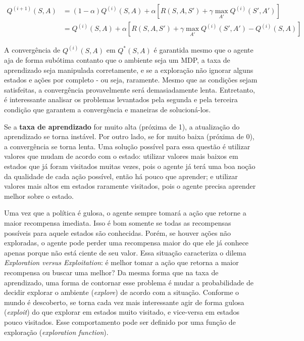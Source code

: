 \begin{equation} \label{eq:q_update}
\begin{align*}
Q^{(i+1)}(S,A) &= (1-\alpha)Q^{(i)}(S,A) + \alpha[R(S,A,S') + \gamma \max_{A'}Q^{(i)}(S',A')] \\
            &= Q^{(i)}(S,A) + \alpha[R(S,A,S') + \gamma \max_{A'}Q^{(i)}(S',A') - Q^{(i)}(S,A)]
\end{align*}
\end{equation}

A convergência de $Q^{(i)}(S,A)$ em $Q^{*}(S,A)$ é garantida mesmo que o agente aja de forma subótima contanto que o ambiente seja um MDP, a taxa de aprendizado seja manipulada corretamente, e se a exploração não ignorar alguns estados e ações por completo - ou seja, raramente. Mesmo que as condições sejam satisfeitas, a convergência provavelmente será demasiadamente lenta. Entretanto, é interessante analisar os problemas levantados pela segunda e pela terceira condição que garantem a convergência e maneiras de solucioná-los.

Se a \textbf{taxa de aprendizado} for muito alta (próxima de 1), a atualização do aprendizado se torna instável. Por outro lado, se for muito baixa (próxima de 0), a convergência se torna lenta. Uma solução possível para essa questão é utilizar valores que mudam de acordo com o estado: utilizar valores mais baixos em estados que já foram visitados muitas vezes, pois o agente já terá uma boa noção da qualidade de cada ação possível, então há pouco que aprender; e utilizar valores mais altos em estados raramente visitados, pois o agente precisa aprender melhor sobre o estado.

Uma vez que a política é gulosa, o agente sempre tomará a ação que retorne a maior recompensa imediata. Isso é bom somente se todas as recompensas possíveis para aquele estados são conhecidas. Porém, se houver ações não exploradas, o agente pode perder uma recompensa maior do que ele já conhece apenas porque não está ciente de seu valor. Essa situação caracteriza o dilema \textit{Exploration versus Exploitation}: é melhor tomar a ação que retorna a maior recompensa ou buscar uma melhor? Da mesma forma que na taxa de aprendizado, uma forma de contornar esse problema é mudar a probabilidade de decidir explorar o ambiente (\textit{explore}) de acordo com a situação. Conforme o mundo é descoberto, se torna cada vez mais interessante agir de forma gulosa (\textit{exploit}) do que explorar em estados muito visitado, e vice-versa em estados pouco visitados. Esse comportamento pode ser definido por uma função de exploração (\textit{exploration function}).


